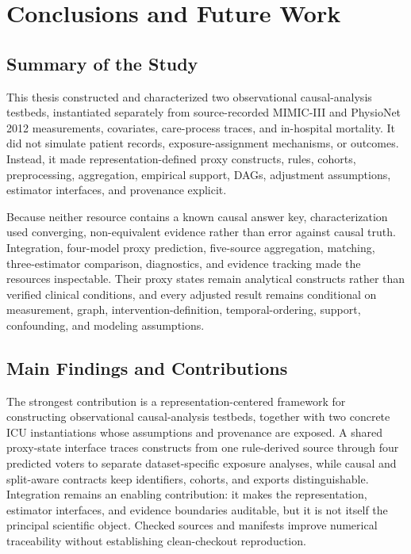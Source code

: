 \chapter{Conclusions and Future Work}
\label{chap:conclusions-future-work}

\section{Summary of the Study}
\label{sec:conclusions-future-work:summary-of-the-study}

This thesis constructed and characterized two observational causal-analysis testbeds, instantiated separately from source-recorded MIMIC-III and PhysioNet 2012 measurements, covariates, care-process traces, and in-hospital mortality.  It did not simulate patient records, exposure-assignment mechanisms, or outcomes.  Instead, it made representation-defined proxy constructs, rules, cohorts, preprocessing, aggregation, empirical support, DAGs, adjustment assumptions, estimator interfaces, and provenance explicit.

Because neither resource contains a known causal answer key, characterization used converging, non-equivalent evidence rather than error against causal truth.  Integration, four-model proxy prediction, five-source aggregation, matching, three-estimator comparison, diagnostics, and evidence tracking made the resources inspectable.  Their proxy states remain analytical constructs rather than verified clinical conditions, and every adjusted result remains conditional on measurement, graph, intervention-definition, temporal-ordering, support, confounding, and modeling assumptions.

\section{Main Findings and Contributions}
\label{sec:conclusions-future-work:main-findings-contributions}

The strongest contribution is a representation-centered framework for constructing observational causal-analysis testbeds, together with two concrete ICU instantiations whose assumptions and provenance are exposed.  A shared proxy-state interface traces constructs from one rule-derived source through four predicted voters to separate dataset-specific exposure analyses, while causal and split-aware contracts keep identifiers, cohorts, and exports distinguishable.  Integration remains an enabling contribution: it makes the representation, estimator interfaces, and evidence boundaries auditable, but it is not itself the principal scientific object.  Checked sources and manifests improve numerical traceability without establishing clean-checkout reproduction.

